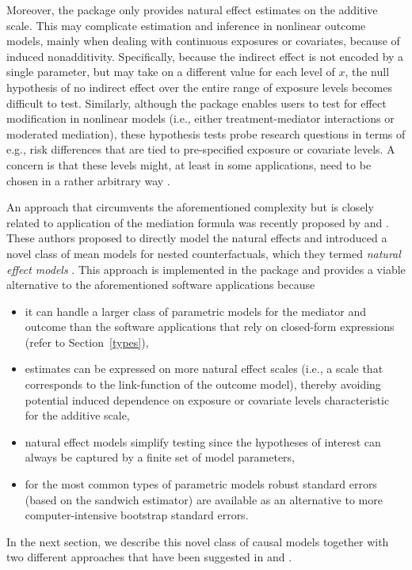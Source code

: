 \documentclass[nojss]{jss}
\begin{document}
\par Moreover, the  package only provides natural effect estimates on the additive scale. This may complicate estimation and inference in nonlinear outcome models, mainly when dealing with continuous exposures or covariates, because of induced nonadditivity. Specifically, because the indirect effect is not encoded by a single parameter, but may take on a different value for each level of $x$, the null hypothesis of no indirect effect over the entire range of exposure levels becomes difficult to test. Similarly, although the  package enables users to test for effect modification in nonlinear models (i.e., either treatment-mediator interactions or moderated mediation), these hypothesis tests probe research questions in terms of e.g., risk differences that are tied to pre-specified exposure or covariate levels. A concern is that these levels might, at least in some applications, need to be chosen in a rather arbitrary way \citep{Loeys2013a}.
\par An approach that circumvents the aforementioned complexity but is closely related to application of the mediation formula was recently proposed by \cite{Lange2012} and \cite{Vansteelandt2012}. These authors proposed to directly model the natural effects and introduced a novel class of mean models for nested counterfactuals, which they termed \textit{natural effect models} \citep[also see][for a similar approach]{VanderLaan2008}. This approach is implemented in the  package and provides a viable alternative to the aforementioned software applications because
\begin{itemize}
\item it can handle a larger class of parametric models for the mediator and outcome than the software applications that rely on closed-form expressions (refer to Section~\ref{types}),
\item estimates can be expressed on more natural effect scales (i.e., a scale that corresponds to the link-function of the outcome model), thereby avoiding potential induced dependence on exposure or covariate levels characteristic for the additive scale,
\item natural effect models simplify testing since the hypotheses of interest can always be captured by a finite set of model parameters,
\item for the most common types of parametric models robust standard errors (based on the sandwich estimator) are available as an alternative to more computer-intensive bootstrap standard errors.
\end{itemize}
In the next section, we describe this novel class of causal models together with two different approaches that have been suggested in \cite{Lange2012} and \cite{Vansteelandt2012}.
\end{document}
